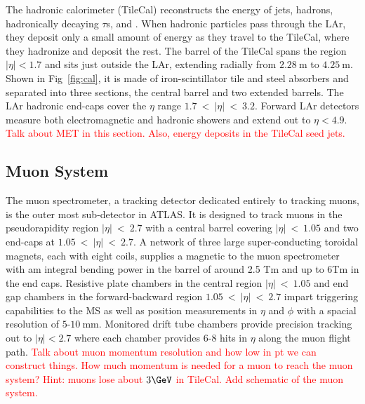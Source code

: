 The hadronic calorimeter (TileCal) reconstructs the energy of jets, hadrons, hadronically decaying $\tau$s, and \met{}.  When hadronic particles pass through the LAr, they deposit only a small amount of energy as they travel to the TileCal, where they hadronize and deposit the rest.  The barrel of the TileCal spans the region $|\eta| < 1.7$ and sits just outside the LAr, extending radially from $2.28~\mathrm{m}$ to $4.25~\mathrm{m}$.  Shown in Fig~\ref{fig:cal}, it is made of iron-scintillator tile and steel absorbers and separated into three sections, the central barrel and two extended barrels. The LAr hadronic end-caps cover the $\eta$ range $1.7~<~|\eta|~<~3.2$.  Forward LAr detectors measure both electromagnetic and hadronic showers and extend out to $\eta<4.9$.  \textcolor{red}{Talk about MET in this section.  Also, energy deposits in the TileCal seed jets.}

\subsection{Muon System}
The muon spectrometer, a tracking detector dedicated entirely to tracking muons, is the outer most sub-detector in ATLAS.  It is designed to track muons in the pseudorapidity region $|\eta|~<~2.7$ with a central barrel covering $|\eta|~<~1.05$ and two end-caps at $1.05~<~|\eta|~<~2.7$.  A network of three large super-conducting toroidal magnets, each with eight coils, supplies a magnetic to the muon spectrometer with am integral bending power in the barrel of around 2.5 Tm and up to 6Tm in the end caps.  Resistive plate chambers in the central region $|\eta|~<~1.05$ and end gap chambers in the forward-backward region $1.05~<~|\eta|~<~2.7$ impart triggering capabilities to the MS as well as position measurements in $\eta$ and $\phi$ with a spacial resolution of $5$-$10~\mathrm{mm}$. Monitored drift tube chambers provide precision tracking out to $|\eta| < 2.7$ where each chamber provides $6$-$8$ hits in $\eta$ along the muon flight path.  \textcolor{red}{Talk about muon momentum resolution and how low in pt we can construct things.  How much momentum is needed for a muon to reach the muon system? Hint: muons lose about $3\GeV$ in TileCal.  Add schematic of the muon system.}

\iffalse
